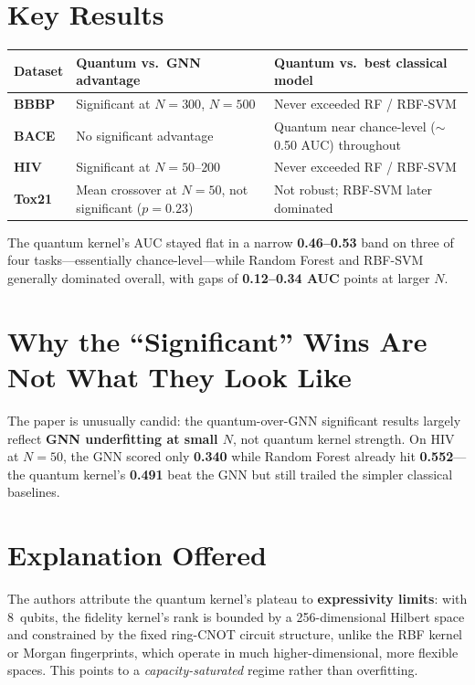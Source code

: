 \documentclass[11pt,a4paper]{article}
\begin{document}
\section*{Key Results}

\begin{center}
\renewcommand{\arraystretch}{1.25}
\begin{tabularx}{\textwidth}{@{}>{\bfseries}l X X@{}}
\toprule
Dataset & Quantum vs.\ GNN advantage & Quantum vs.\ best classical model \\
\midrule
BBBP & Significant at $N=300$, $N=500$ & Never exceeded RF / RBF-SVM \\
BACE & No significant advantage & Quantum near chance-level ($\sim$0.50 AUC) throughout \\
HIV & Significant at $N=50$--$200$ & Never exceeded RF / RBF-SVM \\
Tox21 & Mean crossover at $N=50$, not significant ($p=0.23$) & Not robust; RBF-SVM later dominated \\
\bottomrule
\end{tabularx}
\end{center}

\vspace{0.5em}
The quantum kernel's AUC stayed flat in a narrow \textbf{0.46--0.53} band on three of four tasks---essentially chance-level---while Random Forest and RBF-SVM generally dominated overall, with gaps of \textbf{0.12--0.34 AUC} points at larger $N$.

\section*{Why the ``Significant'' Wins Are Not What They Look Like}
The paper is unusually candid: the quantum-over-GNN significant results largely reflect \textbf{GNN underfitting at small $N$}, not quantum kernel strength.
On HIV at $N=50$, the GNN scored only \textbf{0.340} while Random Forest already hit \textbf{0.552}---the quantum kernel's \textbf{0.491} beat the GNN but still trailed the simpler classical baselines.

\section*{Explanation Offered}
The authors attribute the quantum kernel's plateau to \textbf{expressivity limits}:
with 8~qubits, the fidelity kernel's rank is bounded by a 256-dimensional Hilbert space and constrained by the fixed ring-CNOT circuit structure,
unlike the RBF kernel or Morgan fingerprints, which operate in much higher-dimensional, more flexible spaces.
This points to a \emph{capacity-saturated} regime rather than overfitting.
\end{document}
